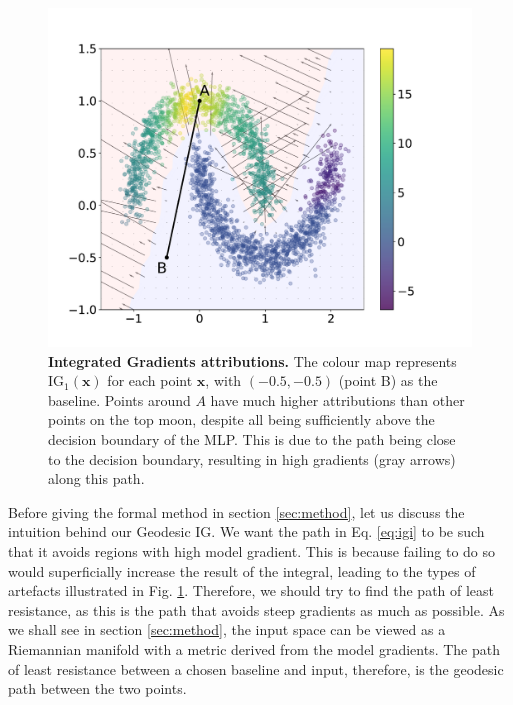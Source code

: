 \begin{figure}[ht]
\vskip -0.1in
\begin{center}
\centerline{\includegraphics[width=\columnwidth]{figures/integrated_gradients_y.pdf}}
\vskip -0.2in
\caption{\textbf{Integrated Gradients attributions.} The colour map represents $\textrm{IG}_1(\textbf{x})$ for each point $\textbf{x}$, with $(-0.5, -0.5)$ (point B) as the baseline. Points around $A$ have much higher attributions than other points on the top moon, despite all being sufficiently above the decision boundary of the MLP. This is due to the path being close to the decision boundary, resulting in high gradients (gray arrows) along this path.}
\label{fig:ig}
\end{center}
\vskip -0.2in
\end{figure}

Before giving the formal method in section \ref{sec:method}, let us discuss the intuition behind our Geodesic IG. We want the path in Eq. \ref{eq:igi} to be such that it avoids regions with high model gradient. This is because failing to do so would superficially increase the result of the integral, leading to the types of artefacts illustrated in Fig. \ref{fig:ig}. Therefore, we should try to find the path of least resistance, as this is the path that avoids steep gradients as much as possible. As we shall see in section \ref{sec:method}, the input space can be viewed as a Riemannian manifold with a metric derived from the model gradients. The path of least resistance between a chosen baseline and input, therefore, is the geodesic path between the two points.

